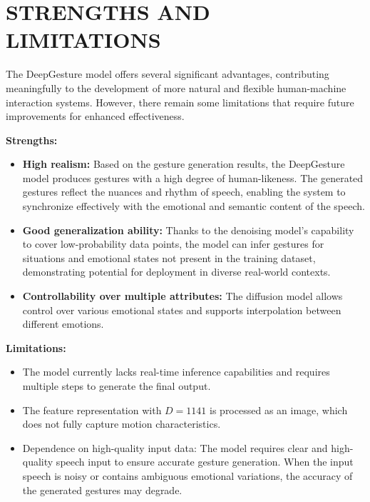 \section{STRENGTHS AND LIMITATIONS}

The DeepGesture model offers several significant advantages, contributing meaningfully to the development of more natural and flexible human-machine interaction systems. However, there remain some limitations that require future improvements for enhanced effectiveness.

\textbf{Strengths:}

\begin{itemize}
	\item \textbf{High realism:} Based on the gesture generation results, the DeepGesture model produces gestures with a high degree of human-likeness. The generated gestures reflect the nuances and rhythm of speech, enabling the system to synchronize effectively with the emotional and semantic content of the speech.
	
	\item \textbf{Good generalization ability:} Thanks to the denoising model's capability to cover low-probability data points, the model can infer gestures for situations and emotional states not present in the training dataset, demonstrating potential for deployment in diverse real-world contexts.
	
	\item \textbf{Controllability over multiple attributes:} The diffusion model allows control over various emotional states and supports interpolation between different emotions.
\end{itemize}

\textbf{Limitations:}

\begin{itemize}
	\item The model currently lacks real-time inference capabilities and requires multiple steps to generate the final output.
	
	\item The feature representation with $D=1141$ is processed as an image, which does not fully capture motion characteristics.
	
	\item Dependence on high-quality input data: The model requires clear and high-quality speech input to ensure accurate gesture generation. When the input speech is noisy or contains ambiguous emotional variations, the accuracy of the generated gestures may degrade.
\end{itemize}

